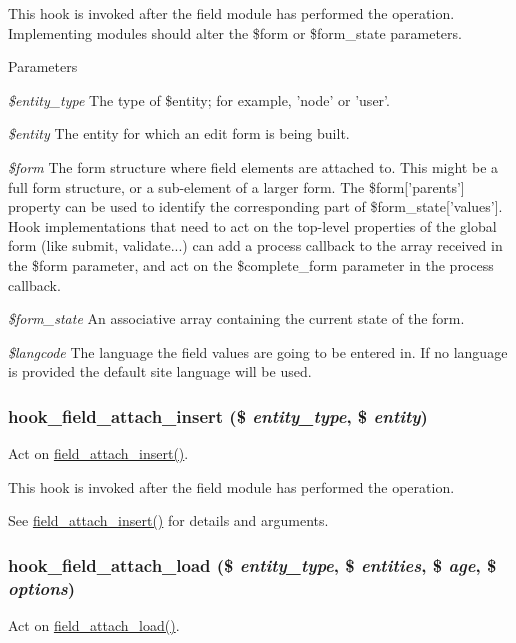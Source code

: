 This hook is invoked after the field module has performed the operation. Implementing modules should alter the \$form or \$form\_\-state parameters.


\begin{DoxyParams}{Parameters}
\item[{\em \$entity\_\-type}]The type of \$entity; for example, 'node' or 'user'. \item[{\em \$entity}]The entity for which an edit form is being built. \item[{\em \$form}]The form structure where field elements are attached to. This might be a full form structure, or a sub-\/element of a larger form. The \$form\mbox{[}'parents'\mbox{]} property can be used to identify the corresponding part of \$form\_\-state\mbox{[}'values'\mbox{]}. Hook implementations that need to act on the top-\/level properties of the global form (like submit, validate...) can add a process callback to the array received in the \$form parameter, and act on the \$complete\_\-form parameter in the process callback. \item[{\em \$form\_\-state}]An associative array containing the current state of the form. \item[{\em \$langcode}]The language the field values are going to be entered in. If no language is provided the default site language will be used. \end{DoxyParams}
\hypertarget{group__field__attach_ga1a964f8aff654dca906c8784ba367115}{
\subsubsection[{hook\_\-field\_\-attach\_\-insert}]{\setlength{\rightskip}{0pt plus 5cm}hook\_\-field\_\-attach\_\-insert (\$ {\em entity\_\-type}, \/  \$ {\em entity})}}
\label{group__field__attach_ga1a964f8aff654dca906c8784ba367115}
Act on \hyperlink{group__field__attach_gad7c37d577b97db5e0c182bc570ed7cf4}{field\_\-attach\_\-insert()}.

This hook is invoked after the field module has performed the operation.

See \hyperlink{group__field__attach_gad7c37d577b97db5e0c182bc570ed7cf4}{field\_\-attach\_\-insert()} for details and arguments. \hypertarget{group__field__attach_gaf684402532a3eaebecc456c751142903}{
\subsubsection[{hook\_\-field\_\-attach\_\-load}]{\setlength{\rightskip}{0pt plus 5cm}hook\_\-field\_\-attach\_\-load (\$ {\em entity\_\-type}, \/  \$ {\em entities}, \/  \$ {\em age}, \/  \$ {\em options})}}
\label{group__field__attach_gaf684402532a3eaebecc456c751142903}
Act on \hyperlink{group__field__attach_ga1e92543395961c912eb293b50e991586}{field\_\-attach\_\-load()}.


